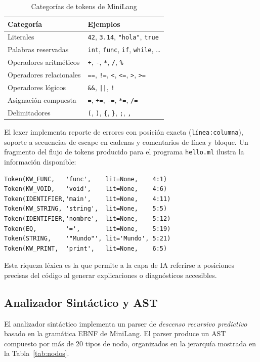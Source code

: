 \documentclass[conference]{IEEEtran}
\begin{document}
\begin{table}[h]
\caption{Categorías de tokens de MiniLang}
\label{tab:tokens}
\centering
\begin{tabular}{ll}
\hline
\textbf{Categoría} & \textbf{Ejemplos} \\
\hline
Literales & \texttt{42}, \texttt{3.14}, \texttt{"hola"}, \texttt{true} \\
Palabras reservadas & \texttt{int}, \texttt{func}, \texttt{if}, \texttt{while}, \ldots \\
Operadores aritméticos & \texttt{+}, \texttt{-}, \texttt{*}, \texttt{/}, \texttt{\%} \\
Operadores relacionales & \texttt{==}, \texttt{!=}, \texttt{<}, \texttt{<=}, \texttt{>}, \texttt{>=} \\
Operadores lógicos & \texttt{\&\&}, \texttt{||}, \texttt{!} \\
Asignación compuesta & \texttt{=}, \texttt{+=}, \texttt{-=}, \texttt{*=}, \texttt{/=} \\
Delimitadores & \texttt{(}, \texttt{)}, \texttt{\{}, \texttt{\}}, \texttt{;}, \texttt{,} \\
\hline
\end{tabular}
\end{table}

El lexer implementa reporte de errores con posición exacta (\texttt{línea:columna}), soporte a secuencias de escape en cadenas y comentarios de línea y bloque. Un fragmento del flujo de tokens producido para el programa \texttt{hello.ml} ilustra la información disponible:

\begin{lstlisting}[language={},numbers=none,caption={Flujo de tokens anotado de hello.ml}]
Token(KW_FUNC,   'func',    lit=None,    4:1)
Token(KW_VOID,   'void',    lit=None,    4:6)
Token(IDENTIFIER,'main',    lit=None,    4:11)
Token(KW_STRING, 'string',  lit=None,    5:5)
Token(IDENTIFIER,'nombre',  lit=None,    5:12)
Token(EQ,        '=',       lit=None,    5:19)
Token(STRING,    '"Mundo"', lit='Mundo', 5:21)
Token(KW_PRINT,  'print',   lit=None,    6:5)
\end{lstlisting}

Esta riqueza léxica es la que permite a la capa de IA referirse a posiciones precisas del código al generar explicaciones o diagnósticos accesibles.

\subsection{Analizador Sintáctico y AST}
El analizador sintáctico implementa un parser de \textit{descenso recursivo predictivo} basado en la gramática EBNF de MiniLang. El parser produce un AST compuesto por más de 20 tipos de nodo, organizados en la jerarquía mostrada en la Tabla~\ref{tab:nodos}.
\end{document}
